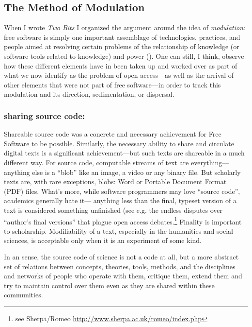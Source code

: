 \documentclass[11pt]{article}
\begin{document}
\subsection*{The Method of Modulation}
\label{sec:org64adcea}

When I wrote \emph{Two Bits} I organized the argument around the idea of \emph{modulation}: free software is simply one important assemblage of technologies, practices, and people aimed at resolving certain problems of the relationship of knowledge (or software tools related to knowledge) and power (\cite{hacking2004histontol,rabinow2003anthtoday}).  One can still, I think, observe how these different elements have in been taken up and worked over as part of what we now identify as the problem of open access---as well as the arrival of other elements that were not part of free software---in order to track this modulation and its direction, sedimentation, or dispersal.

\subsubsection*{\textbf{sharing source code}:}
\label{sec:orga28c06f}
Shareable source code was a concrete and necessary achievement for Free Software to be possible.  Similarly, the necessary ability to share and circulate digital texts is a significant achievement---but such texts are shareable in a much different way.  For source code, computable streams of text are everything---anything else is a ``blob'' like an image, a video or any binary file. But scholarly texts are, with rare exceptions, blobs: Word or Portable Document Format (PDF) files.   What's more, while software programmers may love ``source code'', academics generally hate it--- anything less than the final, typeset version of a text is considered something unfinished (see e.g. the endless disputes over ``author's final versions'' that plague open access debates.\footnote{see Sherpa/Romeo \url{http://www.sherpa.ac.uk/romeo/index.php}}  Finality is important to scholarship.  Modifiability of a text, especially in the humanities and social sciences, is acceptable only when it is an experiment of some kind.

In an sense, the source code of science is not a code at all, but a more abstract set of relations between concepts, theories, tools, methods, and the disciplines and networks of people who operate with them, critique them, extend them and try to maintain control over them even as they are shared within these communities. 
\end{document}
